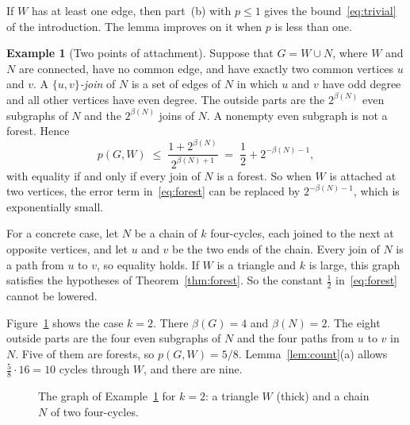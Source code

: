 \documentclass[11pt]{article}
\theoremstyle{definition}
\newtheorem{example}[theorem]{Example}
\theoremstyle{remark}
\newcommand{\half}{\tfrac12}
\numberwithin{equation}{section}
\begin{document}
If $W$ has at least one edge, then part~(b) with $p\le1$ gives the bound~\eqref{eq:trivial} of the
introduction. The lemma improves on it when $p$ is less than one.

\begin{example}[Two points of attachment]\label{rem:twoports}
Suppose that $G=W\cup N$, where $W$ and $N$ are connected, have no common edge, and have exactly two
common vertices $u$ and $v$. A \emph{$\{u,v\}$-join} of $N$ is a set of edges of $N$ in which $u$
and $v$ have odd degree and all other vertices have even degree. The outside parts are the
$2^{\beta(N)}$ even subgraphs of $N$ and the $2^{\beta(N)}$ joins of $N$. A nonempty even subgraph
is not a forest. Hence
\[
  p(G,W)\;\le\;\frac{1+2^{\beta(N)}}{2^{\beta(N)+1}}\;=\;\frac12+2^{-\beta(N)-1},
\]
with equality if and only if every join of $N$ is a forest. So when $W$ is attached at two
vertices, the error term in~\eqref{eq:forest} can be replaced by $2^{-\beta(N)-1}$, which is
exponentially small.

For a concrete case, let $N$ be a chain of $k$ four-cycles, each joined to the next at opposite
vertices, and let $u$ and $v$ be the two ends of the chain. Every join of $N$ is a path from $u$ to
$v$, so equality holds. If $W$ is a triangle and $k$ is large, this graph satisfies the hypotheses
of Theorem~\ref{thm:forest}. So the constant $\half$ in~\eqref{eq:forest} cannot be lowered.

Figure~\ref{fig:twoports} shows the case $k=2$. There $\beta(G)=4$ and $\beta(N)=2$. The eight
outside parts are the four even subgraphs of $N$ and the four paths from $u$ to $v$ in $N$. Five of
them are forests, so $p(G,W)=5/8$. Lemma~\ref{lem:count}(a) allows $\frac58\cdot16=10$ cycles
through $W$, and there are nine.
\end{example}

\begin{figure}[ht]
\centering
{}
\caption{The graph of Example~\ref{rem:twoports} for $k=2$: a triangle $W$ (thick) and a chain $N$
of two four-cycles.}
\label{fig:twoports}
\end{figure}
\end{document}
